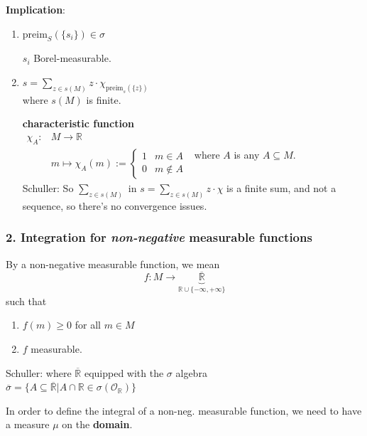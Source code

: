 \textbf{Implication}: \begin{enumerate}
	\item[(1)] $\text{preim}_S( \lbrace s_i \rbrace) \in \sigma$
	
	$s_i$ Borel-measurable.
	\item[(2)] $s = \sum_{z \in s(M)} z \cdot \chi_{\text{preim}_s(\lbrace z \rbrace) }$ \\
where $s(M)$ is finite.

\textbf{characteristic function} \\

$\begin{aligned}
	\chi_{A } : & M \to \mathbb{R} \\
	& m \mapsto \chi_A(m) := \begin{cases} 1 & m \in A \\
		0 & m \notin A \end{cases}
\end{aligned}$ where $A$ is any $A \subseteq M$. \\

Schuller: So $\sum_{z \in s(M)}$ in $s = \sum_{z \in s(M)} z \cdot \chi$ is a finite sum, and not a sequence, so there's no convergence issues. 

\end{enumerate}

\subsubsection{2. Integration for \emph{non-negative} measurable functions}

\begin{definition} By a non-negative measurable function, we mean
\[
f : M \to \underbrace{ \overline{\mathbb{R}}}_{ \mathbb{R} \cup \lbrace -\infty, + \infty \rbrace }
\]
such that \begin{enumerate}
	\item[(i)] $f(m) \geq 0 $ for all $m\in M$
	\item[(ii)] $f$ measurable.
\end{enumerate}
Schuller: where $\overline{\mathbb{R}}$ equipped with the $\sigma$ algebra \\
$\overline{\sigma} = \lbrace A \subseteq \overline{\mathbb{R}} | A \cap \mathbb{R} \in \sigma(\mathcal{O}_{\mathbb{R}}) \rbrace$
\end{definition}

In order to define the integral of a non-neg. measurable function, we need to have a measure $\mu$ on the \textbf{domain}.

